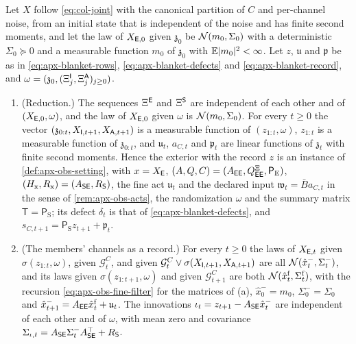 \begin{lemma}\label{lem:apx-blanket-separation}
Let $X$ follow \eqref{eq:col-joint} with the canonical partition of $C$ and per-channel noise, from an initial state that is independent of the noise and has finite second moments, and let the law of $X_{\mathsf{E},0}$ given $\mathfrak z_0$ be $\mathcal{N}(m_0,\Sigma_0)$ with a deterministic $\Sigma_0\succeq0$ and a measurable function $m_0$ of $\mathfrak z_0$ with $\mathbb{E}\lvert m_0\rvert^2<\infty$. Let $z$, $\mathfrak u$ and $\mathfrak p$ be as in \eqref{eq:apx-blanket-rows}, \eqref{eq:apx-blanket-defects} and \eqref{eq:apx-blanket-record}, and $\omega=(\mathfrak z_0,(\Xi^{\mathsf{I}}_j,\Xi^{\mathsf{A}}_j)_{j\ge0})$.
\begin{enumerate}
\item[(a)] (Reduction.) The sequences $\Xi^{\mathsf{E}}$ and $\Xi^{\mathsf{S}}$ are independent of each other and of $(X_{\mathsf{E},0},\omega)$, and the law of $X_{\mathsf{E},0}$ given $\omega$ is $\mathcal{N}(m_0,\Sigma_0)$. For every $t\ge0$ the vector $(\mathfrak z_{0:t},X_{\mathsf{I},t+1},X_{\mathsf{A},t+1})$ is a measurable function of $(z_{1:t},\omega)$, $z_{1:t}$ is a measurable function of $\mathfrak z_{0:t}$, and $\mathfrak u_t$, $a_{C,t}$ and $\mathfrak p_t$ are linear functions of $\mathfrak z_t$ with finite second moments. Hence the exterior with the record $z$ is an instance of \cref{def:apx-obs-setting}, with $x=X_{\mathsf{E}}$, $(A,Q,C)=(A_{\mathsf{E}\mathsf{E}},Q^{\Xi}_{\mathsf{E}\mathsf{E}},\mathsf P_{\mathrm E})$, $(H_{\mathrm x},R_{\mathrm x})=(A_{\mathsf{S}\mathsf{E}},R_{\mathsf{S}})$, the fine act $\mathfrak u_t$ and the declared input $\mathfrak w_t=\bar Ba_{C,t}$ in the sense of \cref{rem:apx-obs-acts}, the randomization $\omega$ and the summary matrix $\mathsf T=\mathsf P_{\mathrm S}$; its defect $\delta_t$ is that of \eqref{eq:apx-blanket-defects}, and $s_{C,t+1}=\mathsf P_{\mathrm S}z_{t+1}+\mathfrak p_t$.
\item[(b)] (The members' channels as a record.) For every $t\ge0$ the laws of $X_{\mathsf{E},t}$ given $\sigma(z_{1:t},\omega)$, given $\mathcal G^C_t$, and given $\mathcal G^C_t\vee\sigma(X_{\mathsf{I},t+1},X_{\mathsf{A},t+1})$ are all $\mathcal{N}(\hat x^-_t,\Sigma^-_t)$, and its laws given $\sigma(z_{1:t+1},\omega)$ and given $\mathcal G^C_{t+1}$ are both $\mathcal{N}(\hat x^{\mathrm f}_t,\Sigma^{\mathrm f}_t)$, with the recursion \eqref{eq:apx-obs-fine-filter} for the matrices of (a), $\hat x^-_0=m_0$, $\Sigma^-_0=\Sigma_0$ and $\hat x^-_{t+1}=A_{\mathsf{E}\mathsf{E}}\hat x^{\mathrm f}_t+\mathfrak u_t$. The innovations $\iota_t=z_{t+1}-A_{\mathsf{S}\mathsf{E}}\hat x^-_t$ are independent of each other and of $\omega$, with mean zero and covariance $\Sigma_{\iota,t}=A_{\mathsf{S}\mathsf{E}}\Sigma^-_tA_{\mathsf{S}\mathsf{E}}^\top+R_{\mathsf{S}}$.

\end{enumerate}
\end{lemma}
